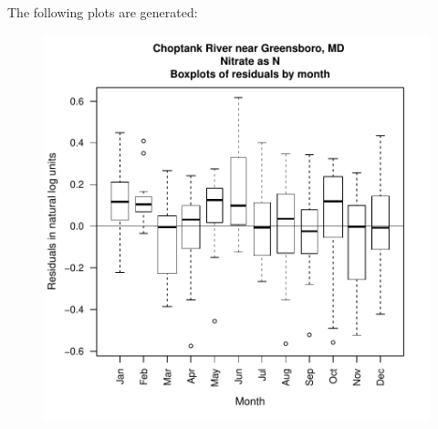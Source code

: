 \documentclass[a4paper,11pt]{article}
\begin{document}
The following plots are generated:
\begin{figure}[htbp]
  \begin{minipage}[h]{0.5\linewidth}
    \begin{center}

\includegraphics{EGRET-figboxResidMonth}
    \label{fig:boxResidMonth}
    \end{center}
  \end{minipage}
  \begin{minipage}[h]{0.5\linewidth}
    \begin{center}



\end{center}
\end{minipage}
\end{figure}
\end{document}
